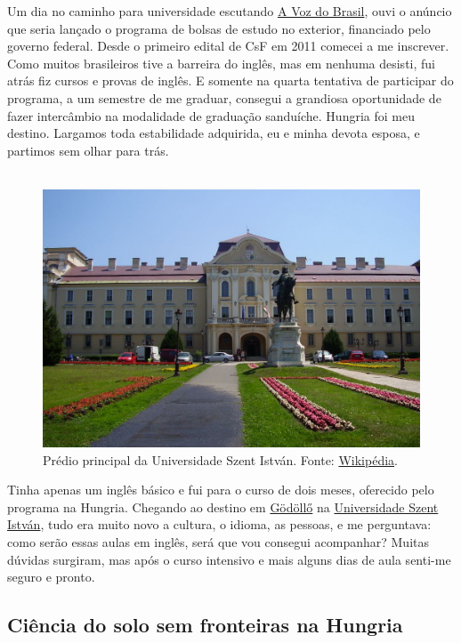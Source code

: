 Um dia no caminho para universidade escutando \href{http://conteudo.ebcservicos.com.br/programas/a-voz-do-brasil}{A Voz do Brasil}, ouvi o anúncio que seria lançado o programa de bolsas de estudo no exterior, financiado pelo governo federal. Desde o primeiro edital de CsF em 2011 comecei a me inscrever. Como muitos brasileiros tive a barreira do inglês, mas em nenhuma desisti, fui atrás fiz cursos e provas de inglês. E somente na quarta tentativa de participar do programa, a um semestre de me graduar, consegui a grandiosa oportunidade de fazer intercâmbio na modalidade de graduação sanduíche. Hungria foi meu destino. Largamos toda estabilidade adquirida, eu e minha devota esposa, e partimos sem olhar para trás.\\
\\
\begin{figure}[htbp]
   \centering
   \includegraphics[scale=0.8]{figuras/yuri-foto-5}
   \caption{Prédio principal da Universidade Szent István. Fonte: \href{http://en.wikipedia.org/wiki/G\%C3\%B6d\%C3\%B6ll\%C5\%91}{Wikipédia}.}
   \label{fig:rótulo-da-figura}
\end{figure}
   
Tinha apenas um inglês básico e fui para o curso de dois meses, oferecido pelo programa na Hungria. Chegando ao destino em \href{http://en.wikipedia.org/wiki/G\%C3\%B6d\%C3\%B6ll\%C5\%91}{Gödöllő} na \href{http://sziu.hu/}{Universidade Szent István}, tudo era muito novo a cultura, o idioma, as pessoas, e me perguntava: como serão essas aulas em inglês, será que vou consegui acompanhar? Muitas dúvidas surgiram, mas após o curso intensivo e mais alguns dias de aula senti-me seguro e pronto.

\subsection{Ciência do solo sem fronteiras na Hungria}

